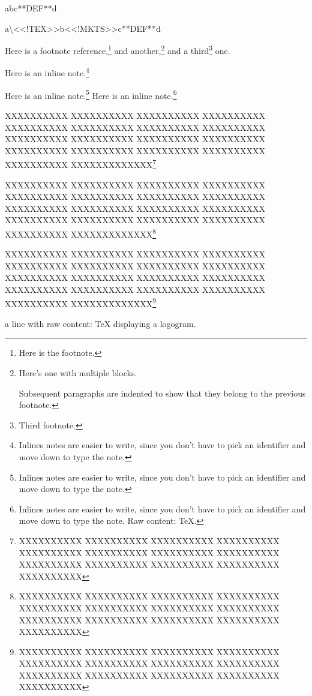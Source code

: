 
\mktsShowpar\par
abc**DEF**d\mktsShowpar\par
{\mktsStyleCode{}a\textbackslash{}<<!TEX>>b<<!MKTS>>c**DEF**d}\mktsShowpar\par
Here is a footnote reference,\footnote{Here is the footnote.} and another,\footnote{Here’s one with multiple blocks.\mktsShowpar\par
Subsequent paragraphs are indented to show that they
belong to the previous footnote.}
and a third\footnote{Third footnote.} one.\mktsShowpar\par
Here is an inline note.\footnote{Inlines notes are easier to write, since
you don't have to pick an identifier and move down to type the
note.}\mktsShowpar\par
Here is an inline note.\footnote{Inlines notes are easier to write, since
you don't have to pick an identifier and move down to type the
note.} Here is an inline note.\footnote{Inlines notes are easier to write, since
you don't have to pick an identifier and move down to type the
note. Raw content: \TeX{}.}\mktsShowpar\par
XXXXXXXXXX XXXXXXXXXX XXXXXXXXXX XXXXXXXXXX XXXXXXXXXX XXXXXXXXXX XXXXXXXXXX XXXXXXXXXX XXXXXXXXXX XXXXXXXXXX XXXXXXXXXX XXXXXXXXXX XXXXXXXXXX XXXXXXXXXX XXXXXXXXXX XXXXXXXXXX XXXXXXXXXX XXXXXXXXXXXXX\footnote{XXXXXXXXXX XXXXXXXXXX XXXXXXXXXX XXXXXXXXXX XXXXXXXXXX XXXXXXXXXX XXXXXXXXXX XXXXXXXXXX XXXXXXXXXX XXXXXXXXXX XXXXXXXXXX XXXXXXXXXX XXXXXXXXXX }\mktsShowpar\par
XXXXXXXXXX XXXXXXXXXX XXXXXXXXXX XXXXXXXXXX XXXXXXXXXX XXXXXXXXXX XXXXXXXXXX XXXXXXXXXX XXXXXXXXXX XXXXXXXXXX XXXXXXXXXX XXXXXXXXXX XXXXXXXXXX XXXXXXXXXX XXXXXXXXXX XXXXXXXXXX XXXXXXXXXX XXXXXXXXXXXXX\footnote{XXXXXXXXXX XXXXXXXXXX XXXXXXXXXX XXXXXXXXXX XXXXXXXXXX XXXXXXXXXX XXXXXXXXXX XXXXXXXXXX XXXXXXXXXX XXXXXXXXXX XXXXXXXXXX XXXXXXXXXX XXXXXXXXXX }\mktsShowpar\par
XXXXXXXXXX XXXXXXXXXX XXXXXXXXXX XXXXXXXXXX XXXXXXXXXX XXXXXXXXXX XXXXXXXXXX XXXXXXXXXX XXXXXXXXXX XXXXXXXXXX XXXXXXXXXX XXXXXXXXXX XXXXXXXXXX XXXXXXXXXX XXXXXXXXXX XXXXXXXXXX XXXXXXXXXX XXXXXXXXXXXXX\footnote{XXXXXXXXXX XXXXXXXXXX XXXXXXXXXX XXXXXXXXXX XXXXXXXXXX XXXXXXXXXX XXXXXXXXXX XXXXXXXXXX XXXXXXXXXX XXXXXXXXXX XXXXXXXXXX XXXXXXXXXX XXXXXXXXXX }\mktsShowpar\par
a line with raw content: \TeX{} displaying a logogram.

